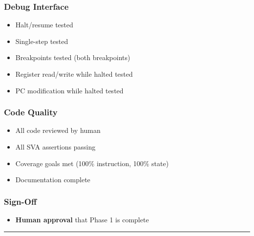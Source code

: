 \subsubsection{Debug Interface}\label{cr:status:phase1-ai-human-responsibilities:debug-interface}

\begin{record}

\begin{itemize}
\tightlist
\item
  \ok{} Halt/\allowbreak{}resume tested
\item
  \ok{} Single-step tested
\item
  \ok{} Breakpoints tested (both breakpoints)
\item
  \ok{} Register read/\allowbreak{}write while halted tested
\item
  \ok{} PC modification while halted tested
\end{itemize}

\end{record}

\subsubsection{Code Quality}\label{cr:status:phase1-ai-human-responsibilities:code-quality}

\begin{record}

\begin{itemize}
\tightlist
\item
  \ok{} All code reviewed by human
\item
  \ok{} All SVA assertions passing
\item
  \ok{} Coverage goals met (100\% instruction, 100\% state)
\item
  \ok{} Documentation complete
\end{itemize}

\end{record}

\subsubsection{Sign-Off}\label{cr:status:phase1-ai-human-responsibilities:sign-off}

\begin{record}

\begin{itemize}
\tightlist
\item
  \ok{} \textbf{Human approval} that Phase 1 is complete
\end{itemize}

\begin{center}\rule{0.5\linewidth}{0.5pt}\end{center}

\end{record}

